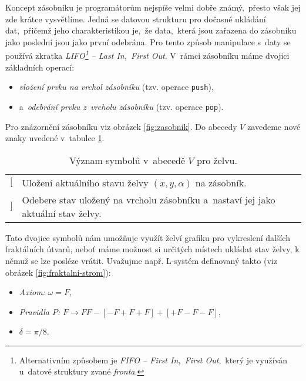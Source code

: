 Koncept zásobníku je programátorům nejspíše velmi dobře známý,~přesto však jej zde krátce vysvětlíme. Jedná se datovou strukturu pro dočasné ukládání dat,~přičemž jeho charakteristikou je,~že data,~která jsou zařazena do zásobníku jako poslední jsou jako první odebrána. Pro tento způsob manipulace s~daty se používá zkratka \emph{LIFO\footnote{Alternativním způsobem je \emph{FIFO -- First In,~First Out},~který je využíván u~datové struktury zvané \emph{fronta}.} -- Last In,~First Out}. V~rámci zásobníku máme dvojici základních operací:
\begin{itemize}
    \item \emph{vložení prvku na vrchol zásobníku} (tzv. operace \texttt{push}),~
    \item a~\emph{odebrání prvku z~vrcholu zásobníku} (tzv. operace \texttt{pop}).
\end{itemize}
Pro znázornění zásobníku viz obrázek \ref{fig:zasobnik}. Do abecedy $V$ zavedeme nové znaky uvedené v~tabulce \ref{table:vyznam-symbolu-zelva-zasobnik}. 
\begin{table}[H]
    \centering
    \begin{tabular}{lp{}}
        $[$ & Uložení aktuálního stavu želvy $(x,y,\alpha)$ na zásobník.\\
        $]$ & Odebere stav uložený na vrcholu zásobníku a~nastaví jej jako aktuální stav želvy.
    \end{tabular}
    \caption{Význam symbolů v~abecedě $V$ pro želvu.}
    \label{table:vyznam-symbolu-zelva-zasobnik}
\end{table}
Tato dvojice symbolů nám umožňuje využít želví grafiku pro vykreslení dalších fraktálních útvarů, neboť máme možnost si určitých místech ukládat stav želvy, k němuž se lze posléze vrátit. Uvažujme např. L-systém definovaný takto (viz obrázek \ref{fig:fraktalni-strom}):
\begin{itemize}
    \item \emph{Axiom:} $\omega=F$,
    \item \emph{Pravidla $P$:} $F\to FF-[-F+F+F]+[+F-F-F]$,
    \item $\delta=\pi/8$.
\end{itemize}
